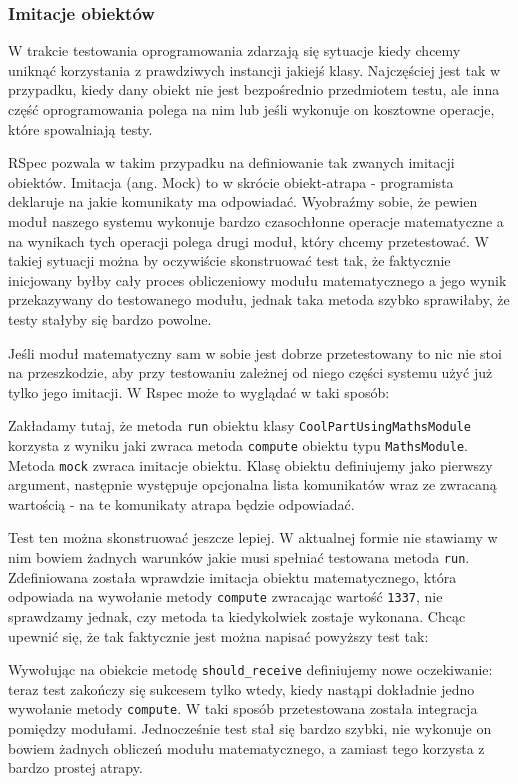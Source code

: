     \subsubsection{Imitacje obiektów}
    W trakcie testowania oprogramowania zdarzają się sytuacje kiedy chcemy uniknąć korzystania z prawdziwych instancji jakiejś klasy. Najczęściej jest tak w przypadku, kiedy dany obiekt nie jest bezpośrednio przedmiotem testu, ale inna część oprogramowania polega na nim lub jeśli wykonuje on kosztowne operacje, które spowalniają testy.
    
    RSpec pozwala w takim przypadku na definiowanie tak zwanych imitacji obiektów. Imitacja (ang. Mock) to w skrócie obiekt-atrapa - programista deklaruje na jakie komunikaty ma odpowiadać. Wyobraźmy sobie, że pewien moduł naszego systemu wykonuje bardzo czasochłonne operacje matematyczne a na wynikach tych operacji polega drugi moduł, który chcemy przetestować. W takiej sytuacji można by oczywiście skonstruować test tak, że faktycznie inicjowany byłby cały proces obliczeniowy modułu matematycznego a jego wynik przekazywany do testowanego modułu, jednak taka metoda szybko sprawiłaby, że testy stałyby się bardzo powolne. 
    
    Jeśli moduł matematyczny sam w sobie jest dobrze przetestowany to nic nie stoi na przeszkodzie, aby przy testowaniu zależnej od niego części systemu użyć już tylko jego imitacji. W Rspec może to wyglądać w taki sposób:
    
    
    
    Zakładamy tutaj, że metoda \texttt{run} obiektu klasy \texttt{CoolPartUsingMathsModule} korzysta z wyniku jaki zwraca metoda \texttt{compute} obiektu typu \texttt{MathsModule}. Metoda \texttt{mock} zwraca imitacje obiektu. Klasę obiektu definiujemy jako pierwszy argument, następnie występuje opcjonalna lista komunikatów wraz ze zwracaną wartością - na te komunikaty atrapa będzie odpowiadać.
    
    Test ten można skonstruować jeszcze lepiej. W aktualnej formie nie stawiamy w nim bowiem żadnych warunków jakie musi spełniać testowana metoda \texttt{run}. Zdefiniowana została wprawdzie imitacja obiektu matematycznego, która odpowiada na wywołanie metody \texttt{compute} zwracając wartość \texttt{1337}, nie sprawdzamy jednak, czy metoda ta kiedykolwiek zostaje wykonana. Chcąc upewnić się, że tak faktycznie jest można napisać powyższy test tak:
    
    

    
    Wywołując na obiekcie metodę \texttt{should\_receive} definiujemy nowe oczekiwanie: teraz test zakończy się sukcesem tylko wtedy, kiedy nastąpi dokładnie jedno wywołanie metody \texttt{compute}. W taki sposób przetestowana została integracja pomiędzy modułami. Jednocześnie test stał się bardzo szybki, nie wykonuje on bowiem żadnych obliczeń modułu matematycznego, a zamiast tego korzysta z bardzo prostej atrapy.

